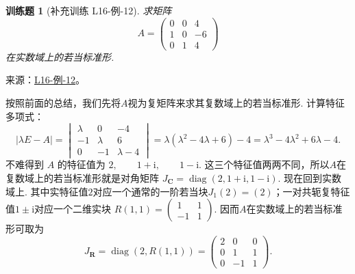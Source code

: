 \documentclass[12pt,fontset=fandol]{ctexart}
\newtheorem{exercise}{训练题}[section]
\begin{document}
\begin{exercise}[补充训练 L16-例-12]\label{prob:L16-例-12}
求矩阵
    \[
        A=\begin{pmatrix}
            0 & 0 & 4 \\
            1 & 0 & -6 \\
            0 & 1 & 4
        \end{pmatrix}
    \]
    在实数域上的若当标准形.
\end{exercise}
\noindent 来源：\href{https://github.com/yhwu-is/Linear-Algebra-Left-Undone/blob/new/%E8%AE%B2%E4%B9%89/%E4%B8%93%E9%A2%98/16%20%E8%8B%A5%E5%BD%93%E6%A0%87%E5%87%86%E5%BD%A2.tex}{L16-例-12}。
\begin{solve}
按照前面的总结，我们先将$A$视为复矩阵来求其复数域上的若当标准形. 计算特征多项式：
    \[
        |\lambda E-A|
        =\begin{vmatrix}
            \lambda & 0 & -4 \\
            -1 & \lambda & 6 \\
            0 & -1 & \lambda-4
        \end{vmatrix}
        =\lambda(\lambda^2-4\lambda+6)-4
        =\lambda^3-4\lambda^2+6\lambda-4.
    \]
    不难得到 $A$ 的特征值为 $2,\qquad 1+\mathrm{i},\qquad 1-\mathrm{i}$. 这三个特征值两两不同，所以$A$在复数域上的若当标准形就是对角矩阵 $J_{\mathbf{C}}=\operatorname{diag}(2,1+\mathrm{i},1-\mathrm{i})$. 现在回到实数域上. 其中实特征值$2$对应一个通常的一阶若当块$J_1(2)=(2)$；一对共轭复特征值$1\pm\mathrm{i}$对应一个二维实块 $R(1,1)=\begin{pmatrix}
            1 & 1 \\
            -1 & 1
        \end{pmatrix}$. 因而$A$在实数域上的若当标准形可取为
    \[
        J_{\mathbf{R}}=\operatorname{diag}(2,R(1,1))
        =\begin{pmatrix}
            2 & 0 & 0 \\
            0 & 1 & 1 \\
            0 & -1 & 1
        \end{pmatrix}.
    \]
\end{solve}
\end{document}
